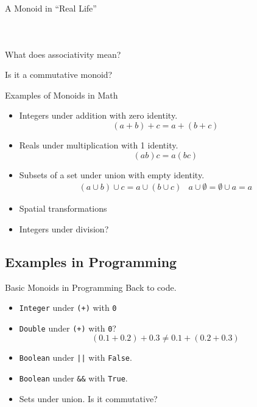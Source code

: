 \documentclass{beamer}
\begin{document}
\begin{framej}
\begin{frame}{A Monoid in ``Real Life''}
\begin{columns}[c]

    \begin{figure}
        \centering
        \def\svgwidth{\columnwidth}
        
    \end{figure}
  \end{columns}

  \alert{What does associativity mean?}

  \alert{Is it a commutative monoid?}
\end{frame}

\begin{frame}{Examples of Monoids in Math}
  \begin{itemize}
    \item Integers under addition with zero identity.
      \[(a + b) + c = a + (b + c)\]
    \item Reals under multiplication with 1 identity.
      \[(a b) c = a (b c)\]
    \item Subsets of a set under union with empty identity.
      \begin{eqnarray*}
      (a \cup b)\cup  c = a\cup  (b\cup  c) & a \cup \emptyset =
        \emptyset \cup a = a
      \end{eqnarray*}
    \item Spatial transformations
    \item Integers under division?
  \end{itemize}
\end{frame}

\subsection{Examples in Programming}

\begin{frame}{Basic Monoids in Programming}
  Back to code.

  \begin{itemize}
    \item \texttt{Integer} under \texttt{(+)} with \texttt{0}
    \item \texttt{Double} under \texttt{(+)} with \texttt{0}?
      \pause
      \[ (0.1+0.2)+0.3 \neq 0.1+(0.2+0.3)\]
      \pause
    \item \texttt{Boolean} under \texttt{||} with \texttt{False}.
    \item \texttt{Boolean} under \texttt{\&\&} with \texttt{True}.
    \item Sets under union. Is it commutative?
  \end{itemize}
\end{frame}


\end{framej}
\end{document}
